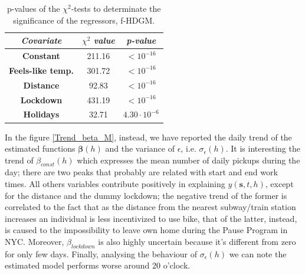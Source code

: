 \begin{table}
	\centering
	\renewcommand\arraystretch{1.3}
	\begin{tabular}{c|c|c}
		\hline
		\textit{Covariate} & $\chi^2$ \textit{value} & \textit{p-value} \\
		\hline
		\textbf{Constant} & \num{211.16} & $< 10^{-16}$ \\
		\hline
		\textbf{Feels-like temp.} & \num{301.72} & $< 10^{-16}$ \\
		\hline
		\textbf{Distance} & \num{92.83} & $<10^{-16}$ \\
		\hline
		\textbf{Lockdown} & \num{431.19} & $<10^{-16}$ \\
		\hline
		\textbf{Holidays} & \num{32.71} & $4.30 \cdot 10^{-6}$ \\
		\hline
	\end{tabular}
	\caption[p-values of the $\chi^2$-tests to determinate the significance of the regressors (f-HDGM)]{p-values of the $\chi^2$-tests to determinate the significance of the regressors, f-HDGM.}
	\label{Chi2_p_values}
\end{table}

\noindent
In the figure \ref{Trend_beta_M}, instead, we have reported the daily trend of the estimated functions $\boldsymbol{\beta}(h)$ and the variance of $\epsilon$, i.e. $\sigma_{\epsilon}(h)$. It is interesting the trend of $\beta_{const}(h)$ which expresses the mean number of daily pickups during the day; there are two peaks that probably are related with start and end work times. All others variables contribute positively in explaining $y(\boldsymbol{s}, t, h)$, except for the distance and the dummy lockdown; the negative trend of the former is correlated to the fact that as the distance from the nearest subway/train station increases an individual is less incentivized to use bike, that of the latter, instead, is caused to the impossibility to leave own home during the Pause Program in NYC. Moreover, $\beta_{lockdown}$ is also highly uncertain because it's different from zero for only few days. Finally, analysing the behaviour of $\sigma_{\epsilon}(h)$ we can note the estimated model performs worse around 20 o'clock.

